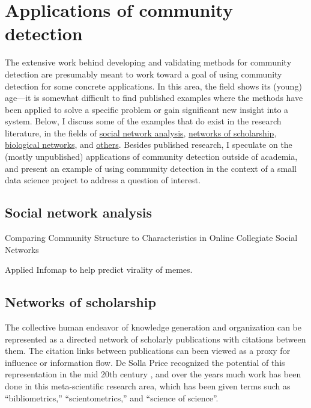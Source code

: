 \section{Applications of community
detection}\label{applications-of-community-detection}

The extensive work behind developing and validating methods for
community detection are presumably meant to work toward a goal of using
community detection for some concrete applications. In this area, the
field shows its (young) age---it is somewhat difficult to find published
examples where the methods have been applied to solve a specific problem
or gain significant new insight into a system. Below, I discuss some of
the examples that do exist in the research literature, in the fields of
\protect\hyperlink{social-network-analysis}{social network analysis},
\protect\hyperlink{networks-of-scholarship}{networks of scholarship},
\protect\hyperlink{biological-networks}{biological networks}, and
\protect\hyperlink{other-research}{others}. Besides published research,
I speculate on the (mostly unpublished) applications of community
detection outside of academia, and present an example of using community
detection in the context of a small data science project to address a
question of interest.

\hypertarget{social-network-analysis}{\subsection{Social network
analysis}\label{social-network-analysis}}

\autocite{traud_comparing_2011} Comparing Community Structure to
Characteristics in Online Collegiate Social Networks

\autocite{weng_virality_2013} Applied Infomap to help predict virality
of memes.

\hypertarget{networks-of-scholarship}{\subsection{Networks of
scholarship}\label{networks-of-scholarship}}

The collective human endeavor of knowledge generation and organization
can be represented as a directed network of scholarly publications with
citations between them. The citation links between publications can been
viewed as a proxy for influence or information flow. De Solla Price
recognized the potential of this representation in the mid 20th century
\autocite{de_solla_price_networks_1965}, and over the years much work
has been done in this meta-scientific research area, which has been
given terms such as ``bibliometrics,'' ``scientometrics,'' and ``science
of science''.

